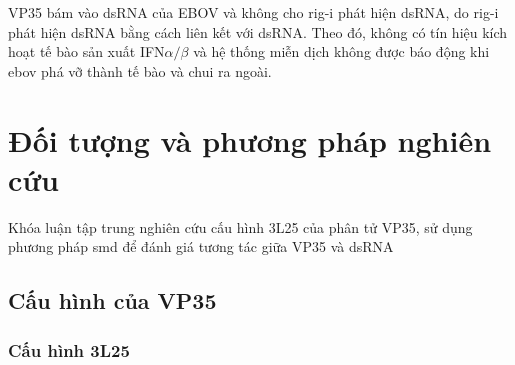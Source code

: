 \documentclass[12pt,a4paper,reqno, oneside]{book}
\begin{document}
		VP35 bám vào dsRNA của EBOV và không cho \gls{rig-i} phát hiện dsRNA, do \gls{rig-i} phát hiện dsRNA bằng cách liên kết với dsRNA. Theo đó, không có tín hiệu kích hoạt tế bào sản xuất IFN$\alpha / \beta$ và hệ thống miễn dịch không được báo động khi \gls{ebov} phá vỡ thành tế bào và chui ra ngoài\cite{Hartman2004}.



\newpage
\pagestyle{fancy}
\setcounter{chapter}{1}
\chapter{Đối tượng và phương pháp nghiên cứu}

	Khóa luận tập trung nghiên cứu cấu hình 3L25 của phân tử VP35, sử dụng phương pháp \gls{smd} để đánh giá tương tác giữa VP35 và dsRNA
\section{Cấu hình của VP35}
	\subsection{Cấu hình 3L25}
	
\end{document}
